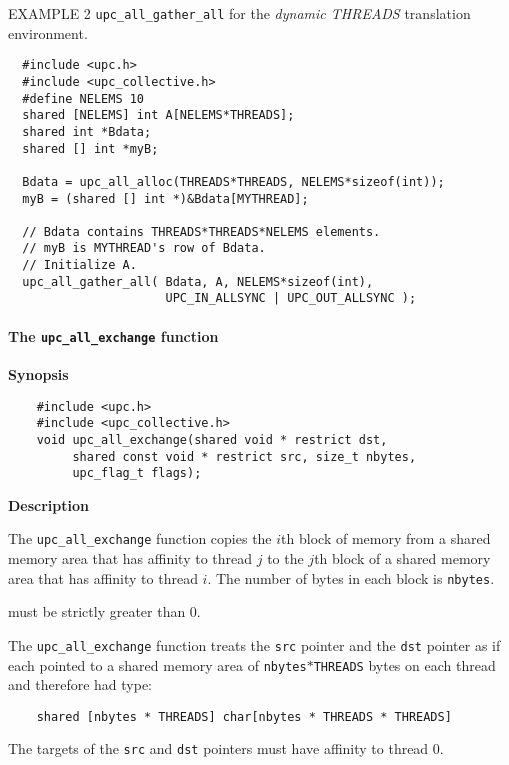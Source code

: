 \np EXAMPLE 2 {\tt upc\_all\_gather\_all} for the {\em dynamic THREADS}
translation environment.

\begin{verbatim}
  #include <upc.h>
  #include <upc_collective.h>
  #define NELEMS 10
  shared [NELEMS] int A[NELEMS*THREADS];
  shared int *Bdata;
  shared [] int *myB;

  Bdata = upc_all_alloc(THREADS*THREADS, NELEMS*sizeof(int));
  myB = (shared [] int *)&Bdata[MYTHREAD];

  // Bdata contains THREADS*THREADS*NELEMS elements.
  // myB is MYTHREAD's row of Bdata.
  // Initialize A.
  upc_all_gather_all( Bdata, A, NELEMS*sizeof(int),
                      UPC_IN_ALLSYNC | UPC_OUT_ALLSYNC );
\end{verbatim}

\paragraph{The {\tt upc\_all\_exchange} function}

{\bf Synopsis} 

\npf\vspace{-2.5em}
\begin{verbatim}
    #include <upc.h>
    #include <upc_collective.h>
    void upc_all_exchange(shared void * restrict dst, 
         shared const void * restrict src, size_t nbytes,
         upc_flag_t flags);
\end{verbatim}

{\bf Description} 

\np The {\tt upc\_all\_exchange} function copies the $i$th block of memory
from a shared memory area that has affinity to thread $j$ to the $j$th block
of a shared memory area that has affinity to thread $i$.
The number of bytes in each block is {\tt nbytes}.

 must be strictly greater than 0.

\np The {\tt upc\_all\_exchange} function treats the {\tt src} pointer
and the {\tt dst} pointer as if each
pointed to a shared memory area of {\tt nbytes}$*${\tt THREADS} bytes
on each thread and therefore had type:

\begin{verbatim}
    shared [nbytes * THREADS] char[nbytes * THREADS * THREADS]
\end{verbatim}  

\np The targets of the {\tt src} and {\tt dst} pointers
must have affinity to thread 0.

